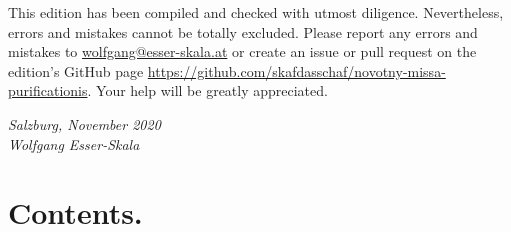 \documentclass[parskip=full]{scrreprt}
\newif\iftemplate\templatetrue
\begin{document}
This edition has been compiled and checked with utmost diligence. Nevertheless, errors and mistakes cannot be totally excluded. Please report any errors and mistakes to \url{wolfgang@esser-skala.at} or create an issue or pull request on the edition’s GitHub page \url{https://github.com/skafdasschaf/novotny-missa-purificationis}. Your help will be greatly appreciated.

\bigskip
\textit{Salzburg, November 2020\\
Wolfgang Esser-Skala}

\cleardoublepage
\chapter*{Contents.}


\cleardoublepage
\fi

\iftemplate

\fi
\end{document}
